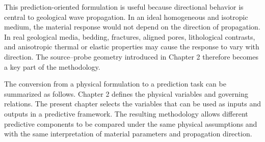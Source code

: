 This prediction-oriented formulation is useful because directional behavior is central to geological wave propagation. In an ideal homogeneous and isotropic medium, the material response would not depend on the direction of propagation. In real geological media, bedding, fractures, aligned pores, lithological contrasts, and anisotropic thermal or elastic properties may cause the response to vary with direction. The source--probe geometry introduced in Chapter 2 therefore becomes a key part of the methodology.

The conversion from a physical formulation to a prediction task can be summarized as follows. Chapter 2 defines the physical variables and governing relations. The present chapter selects the variables that can be used as inputs and outputs in a predictive framework. The resulting methodology allows different predictive components to be compared under the same physical assumptions and with the same interpretation of material parameters and propagation direction.
